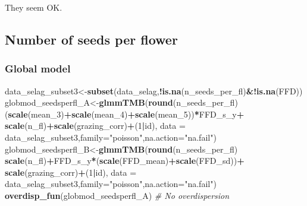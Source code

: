 \documentclass[
]{article}
\newenvironment{Shaded}{\begin{snugshade}}{\end{snugshade}}
\newcommand{\CommentTok}[1]{\textcolor[rgb]{0.56,0.35,0.01}{\textit{#1}}}
\newcommand{\DataTypeTok}[1]{\textcolor[rgb]{0.13,0.29,0.53}{#1}}
\newcommand{\DecValTok}[1]{\textcolor[rgb]{0.00,0.00,0.81}{#1}}
\newcommand{\KeywordTok}[1]{\textcolor[rgb]{0.13,0.29,0.53}{\textbf{#1}}}
\newcommand{\NormalTok}[1]{#1}
\newcommand{\OperatorTok}[1]{\textcolor[rgb]{0.81,0.36,0.00}{\textbf{#1}}}
\newcommand{\StringTok}[1]{\textcolor[rgb]{0.31,0.60,0.02}{#1}}
\begin{document}
They seem OK.

\hypertarget{number-of-seeds-per-flower-1}{%
\subsection{Number of seeds per
flower}\label{number-of-seeds-per-flower-1}}

\hypertarget{global-model}{%
\subsubsection{Global model}\label{global-model}}

\begin{Shaded}
\begin{Highlighting}[]
\NormalTok{data_selag_subset3<-}\KeywordTok{subset}\NormalTok{(data_selag,}\OperatorTok{!}\KeywordTok{is.na}\NormalTok{(n_seeds_per_fl)}\OperatorTok{&!}\KeywordTok{is.na}\NormalTok{(FFD))}
\NormalTok{globmod_seedsperfl_A<-}\KeywordTok{glmmTMB}\NormalTok{(}\KeywordTok{round}\NormalTok{(n_seeds_per_fl)}\OperatorTok{~}
\StringTok{                                }\NormalTok{(}\KeywordTok{scale}\NormalTok{(mean_}\DecValTok{3}\NormalTok{)}\OperatorTok{+}\KeywordTok{scale}\NormalTok{(mean_}\DecValTok{4}\NormalTok{)}\OperatorTok{+}\KeywordTok{scale}\NormalTok{(mean_}\DecValTok{5}\NormalTok{))}\OperatorTok{*}\NormalTok{FFD_s_y}\OperatorTok{+}
\StringTok{                                }\KeywordTok{scale}\NormalTok{(n_fl)}\OperatorTok{+}\KeywordTok{scale}\NormalTok{(grazing_corr)}\OperatorTok{+}\NormalTok{(}\DecValTok{1}\OperatorTok{|}\NormalTok{id),}
                              \DataTypeTok{data =}\NormalTok{ data_selag_subset3,}\DataTypeTok{family=}\StringTok{"poisson"}\NormalTok{,}\DataTypeTok{na.action=}\StringTok{"na.fail"}\NormalTok{)}
\NormalTok{globmod_seedsperfl_B<-}\KeywordTok{glmmTMB}\NormalTok{(}\KeywordTok{round}\NormalTok{(n_seeds_per_fl)}\OperatorTok{~}
\StringTok{                              }\KeywordTok{scale}\NormalTok{(n_fl)}\OperatorTok{+}\NormalTok{FFD_s_y}\OperatorTok{*}\NormalTok{(}\KeywordTok{scale}\NormalTok{(FFD_mean)}\OperatorTok{+}\KeywordTok{scale}\NormalTok{(FFD_sd))}\OperatorTok{+}
\StringTok{                              }\KeywordTok{scale}\NormalTok{(grazing_corr)}\OperatorTok{+}\NormalTok{(}\DecValTok{1}\OperatorTok{|}\NormalTok{id),}
                         \DataTypeTok{data =}\NormalTok{ data_selag_subset3,}\DataTypeTok{family=}\StringTok{"poisson"}\NormalTok{,}\DataTypeTok{na.action=}\StringTok{"na.fail"}\NormalTok{)}
\KeywordTok{overdisp_fun}\NormalTok{(globmod_seedsperfl_A) }\CommentTok{# No overdispersion}
\end{Highlighting}
\end{Shaded}
\end{document}

